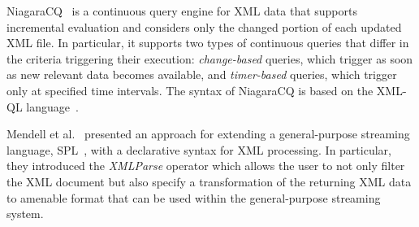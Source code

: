 NiagaraCQ~\cite{chen_et_al_2000} is a 
continuous query engine for XML data that supports incremental evaluation
and considers only the changed portion of each updated XML file. In particular, it
supports two types of continuous queries that differ in the criteria
triggering their execution: \emph{change-based} queries, which trigger
as soon as new relevant data becomes available, and \emph{timer-based}
queries, which trigger only at specified time intervals.  The syntax of NiagaraCQ is
based on the XML-QL language~\cite{deutsch1999query}.  \iffalse It provides a command
language for creating continuous queries that follows the form
illustrated in Figure~\ref{fig:Niagra}. Using this command language,
users can implement continuous queries that combines an ordinary
XML-QL query with additional time information.  The
\textsf{\small\textit{xml\_ql\_query}} becomes effective at the
defined \textsf{\small\textit{start\_time}}.  The
\textsf{\small\textit{time\_interval}} indicates how often the query
will be executed. A query is timer-based if its
\textsf{\small\textit{time\_interval}} is non-zero; otherwise, it is
change-based.  The continuous query will be deactivated after its
\textsf{\small\textit{expiration\_time}}. The
\textsf{\small\textit{action}} triggers once the results of the XML-QL
query expression is returned.  A key optimization mechanism used in
the NiagaraCQ system is grouping the execution of similar queries to
minimize redundant work.\fi


Mendell et al.~\cite{mendell_et_al_2012} presented an approach for extending a general-purpose streaming language, SPL~\cite{hirzel_schneider_gedik_2017}, 
with a declarative syntax for XML processing.
In particular,  they introduced the  \emph{XMLParse} operator which allows the user 
to not only filter the XML document but also specify a transformation of the returning XML data 
 to amenable format that can be used within the general-purpose streaming system.

